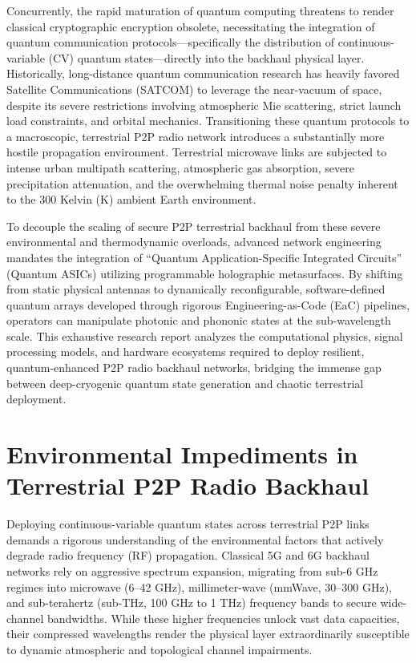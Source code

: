 \documentclass[11pt,a4paper]{article}
\begin{document}
Concurrently, the rapid maturation of quantum computing threatens to render classical cryptographic encryption obsolete, necessitating the integration of quantum communication protocols---specifically the distribution of continuous-variable (CV) quantum states---directly into the backhaul physical layer.\cite{ref6} Historically, long-distance quantum communication research has heavily favored Satellite Communications (SATCOM) to leverage the near-vacuum of space, despite its severe restrictions involving atmospheric Mie scattering, strict launch load constraints, and orbital mechanics.\cite{ref6} Transitioning these quantum protocols to a macroscopic, terrestrial P2P radio network introduces a substantially more hostile propagation environment. Terrestrial microwave links are subjected to intense urban multipath scattering, atmospheric gas absorption, severe precipitation attenuation, and the overwhelming thermal noise penalty inherent to the 300 Kelvin (K) ambient Earth environment.\cite{ref2}

To decouple the scaling of secure P2P terrestrial backhaul from these severe environmental and thermodynamic overloads, advanced network engineering mandates the integration of ``Quantum Application-Specific Integrated Circuits'' (Quantum ASICs) utilizing programmable holographic metasurfaces.\cite{ref6} By shifting from static physical antennas to dynamically reconfigurable, software-defined quantum arrays developed through rigorous Engineering-as-Code (EaC) pipelines, operators can manipulate photonic and phononic states at the sub-wavelength scale.\cite{ref6} This exhaustive research report analyzes the computational physics, signal processing models, and hardware ecosystems required to deploy resilient, quantum-enhanced P2P radio backhaul networks, bridging the immense gap between deep-cryogenic quantum state generation and chaotic terrestrial deployment.

\section{Environmental Impediments in Terrestrial P2P Radio Backhaul}

Deploying continuous-variable quantum states across terrestrial P2P links demands a rigorous understanding of the environmental factors that actively degrade radio frequency (RF) propagation. Classical 5G and 6G backhaul networks rely on aggressive spectrum expansion, migrating from sub-6 GHz regimes into microwave (6--42 GHz), millimeter-wave (mmWave, 30--300 GHz), and sub-terahertz (sub-THz, 100 GHz to 1 THz) frequency bands to secure wide-channel bandwidths.\cite{ref4} While these higher frequencies unlock vast data capacities, their compressed wavelengths render the physical layer extraordinarily susceptible to dynamic atmospheric and topological channel impairments.\cite{ref14}
\end{document}
